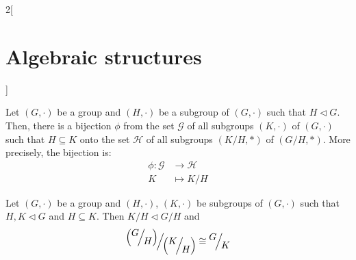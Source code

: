 \documentclass[../../../main.tex]{subfiles}
\begin{document}
\begin{multicols}{2}[\section{Algebraic structures}]
\begin{theorem}
    Let $(G,\cdot)$ be a group and $(H,\cdot)$ be a subgroup of $(G,\cdot)$ such that $H\lhd G$. Then, there is a bijection $\phi$ from the set $\mathcal{G}$ of all subgroups $(K,\cdot)$ of $(G,\cdot)$ such that $H\subseteq K$ onto the set $\mathcal{H}$ of all subgroups $\left(K/H,*\right)$ of $\left(G/H,*\right)$. More precisely, the bijection is:
    \begin{align*}
      \phi:\mathcal{G} & \longrightarrow\mathcal{H} \\
      K                & \longmapsto K/H
    \end{align*}
  \end{theorem}
  \begin{theorem}
    Let $(G,\cdot)$ be a group and $(H,\cdot)$, $(K,\cdot)$ be subgroups of $(G,\cdot)$ such that $H,K\lhd G$ and $H\subseteq K$. Then $K/H\lhd G/H$ and $$\quot{\left(\quot{G}{H}\right)}{\left(\quot{K}{H}\right)}\cong\quot{G}{K}$$
  \end{theorem}

\end{multicols}
\end{document}
